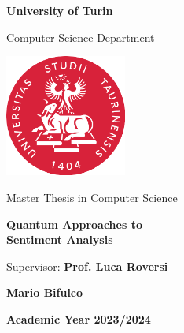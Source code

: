\begin{center}
{\LARGE \textbf{University of Turin}}
\vspace{0.2cm}

{\Large {Computer Science Department}} 
\vspace{1cm}

\includegraphics[width=4cm]{figures/unito-logo.png}
\vspace{0.8cm}

{\Large {Master Thesis in Computer Science}}
\vspace{1cm}

{\LARGE \textbf{Quantum Approaches to \\Sentiment Analysis}}
\vspace{1cm}

\end{center}

\begin{multicols}{2}
\noindent \large{Supervisor:} \linebreak
\large{\textbf{Prof. Luca Roversi}} 
\vspace{0.1cm}


\columnbreak

 \linebreak
\large{\textbf{Mario Bifulco}} 
\end{multicols}
\vspace{2cm}

\begin{center}
    \large{\textbf{Academic Year 2023/2024}}
\end{center}


